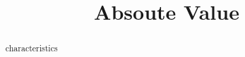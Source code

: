 \documentclass{ximera}
\title{Absoute Value}
\begin{document}
\begin{abstract}
characteristics
\end{abstract}
\maketitle
\end{document}
